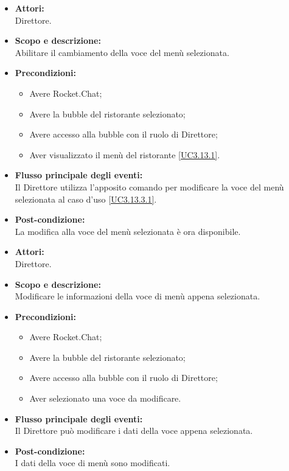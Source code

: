 
\begin{itemize}
	\item \textbf{Attori:}
	\\Direttore.
	\item \textbf{Scopo e descrizione:} 
	\\Abilitare il cambiamento della voce del menù selezionata.
	\item \textbf{Precondizioni:}
	\begin{itemize}
		\item Avere Rocket.Chat;
		\item Avere la bubble del ristorante selezionato;
		\item Avere accesso alla bubble con il ruolo di Direttore;
		\item Aver visualizzato il menù del ristorante \ref{UC3.13.1}.
	\end{itemize}
	\item \textbf{Flusso principale degli eventi:}
	\\Il Direttore utilizza l'apposito comando per modificare la voce del menù selezionata al caso d'uso \ref{UC3.13.3.1}.
	\item \textbf{Post-condizione:}
	\\La modifica alla voce del menù selezionata è ora disponibile.
\end{itemize}


\begin{itemize}
	\item \textbf{Attori:}
	\\Direttore.
	\item \textbf{Scopo e descrizione:} 
	\\Modificare le informazioni della voce di menù appena selezionata.
	\item \textbf{Precondizioni:}
	\begin{itemize}
		\item Avere Rocket.Chat;
		\item Avere la bubble del ristorante selezionato;
		\item Avere accesso alla bubble con il ruolo di Direttore;
		\item Aver selezionato una voce da modificare.
	\end{itemize}
	\item \textbf{Flusso principale degli eventi:}
	\\Il Direttore può modificare i dati della voce appena selezionata.
	\item \textbf{Post-condizione:}
	\\I dati della voce di menù sono modificati.
\end{itemize}

